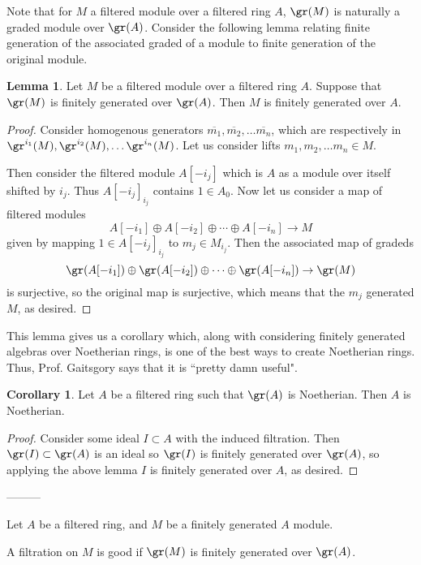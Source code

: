 \documentclass[12 pt]{article}
\theoremstyle{definition}
\newtheorem{corollary}[theorem]{Corollary}
\newtheorem{lemma}[theorem]{Lemma}
\newcommand\ol{\overline}
\begin{document}
Note that for $M$ a filtered module over a filtered ring $A$, $\gr(M)$ is naturally a graded module over $\gr(A)$. Consider the following lemma relating finite generation of the associated graded of a module to finite generation of the original module.

\begin{lemma} Let $M$ be a filtered module over a filtered ring $A$. Suppose that $\gr(M)$ is finitely generated over $\gr(A)$. Then $M$ is finitely generated over $A$.
\end{lemma}

\begin{proof} Consider homogenous generators $\ol{m_1}, \ol{m_2}, \ldots \ol{m_n}$, which are respectively in $\\ \gr^{i_1}(M), \gr^{i_2}(M), \ldots \gr^{i_n}(M)$. Let us consider lifts $m_1, m_2, \ldots m_n \in M$.

Then consider the filtered module $A[-i_j]$ which is $A$ as a module over itself shifted by $i_j$. Thus $A[-i_j]_{i_j}$ contains $1 \in A_0$. Now let us consider a map of filtered modules
\[A[-i_1] \oplus A[-i_2] \oplus \cdots \oplus A[-i_n] \to M\]
given by mapping $1 \in A[-i_j]_{i_j}$ to $m_{j} \in M_{i_j}$. Then the associated map of gradeds
\[\gr(A[-i_1]) \oplus \gr(A[-i_2]) \oplus \cdots \oplus \gr(A[-i_n]) \to \gr(M)\]
is surjective, so the original map is surjective, which means that the $m_j$ generated $M$, as desired.
\end{proof}

This lemma gives us a corollary which, along with considering finitely generated algebras over Noetherian rings, is one of the best ways to create Noetherian rings. Thus, Prof. Gaitsgory says that it is ``pretty damn useful".

\begin{corollary} Let $A$ be a filtered ring such that $\gr(A)$ is Noetherian. Then $A$ is Noetherian.
\end{corollary}
\begin{proof} Consider some ideal $I \subset A$ with the induced filtration. Then $\gr(I) \subset \gr(A)$ is an ideal so $\gr(I)$ is finitely generated over $\gr(A)$, so applying the above lemma $I$ is finitely generated over $A$, as desired.
\end{proof}


---------

Let $A$ be a filtered ring, and $M$ be a finitely generated $A$ module.

\begin{definition} A filtration on $M$ is good if $\gr(M)$ is finitely generated over $\gr(A)$.
\end{definition}
\end{document}
